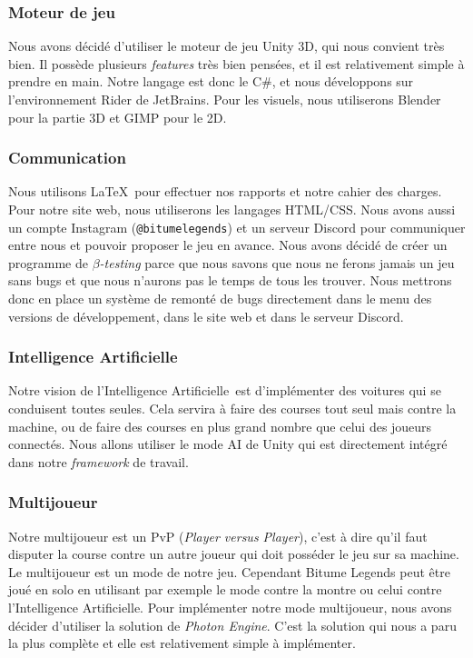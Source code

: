 \documentclass[11pt,a4paper]{article}
\newcommand{\AI}{Intelligence Artificielle}
\begin{document}
    \subsubsection{Moteur de jeu}
      Nous avons décidé d'utiliser le moteur de jeu Unity 3D, qui nous convient très bien. Il possède plusieurs 
      \textit{features} très bien pensées, et il est relativement simple à prendre en main. Notre langage est 
      donc le C\#, et nous développons sur l'environnement Rider de JetBrains. Pour les visuels, nous
      utiliserons Blender pour la partie 3D et GIMP pour le 2D.
    \subsubsection{Communication}
      Nous utilisons \LaTeX\, pour effectuer nos rapports et notre cahier des charges. Pour notre site web, 
      nous utiliserons les langages HTML/CSS. Nous avons aussi un compte Instagram (\texttt{@bitumelegends}) 
      et un serveur Discord pour communiquer entre nous et pouvoir proposer le jeu en avance.
      Nous avons décidé de créer un programme de \(\beta\)\textit{-testing} parce que nous savons que nous 
      ne ferons jamais un jeu sans bugs et que nous n'aurons pas le temps de tous les trouver. Nous mettrons
      donc en place un système de remonté de bugs directement dans le menu des versions de développement, 
      dans le site web et dans le serveur Discord.
    \subsubsection{\AI}
      Notre vision de l'\AI\, est d'implémenter des voitures qui se conduisent toutes seules.
      Cela servira à faire des courses tout seul mais contre la machine, ou de faire des courses en plus grand
      nombre que celui des joueurs connectés. Nous allons utiliser le mode AI de Unity qui est directement intégré
      dans notre \textit{framework} de travail.
    \subsubsection{Multijoueur}
      Notre multijoueur est un PvP (\textit{Player versus Player}), c'est à dire qu'il faut disputer la course 
      contre un autre joueur qui doit posséder le jeu sur sa machine. Le multijoueur est un mode de notre jeu. 
      Cependant Bitume Legends peut être joué en solo en utilisant par exemple le mode contre la montre ou 
      celui contre l'Intelligence Artificielle. Pour implémenter notre mode multijoueur, nous avons décider 
      d'utiliser la solution de \emph{Photon Engine}. C'est la solution qui nous a paru la plus complète et 
      elle est relativement simple à implémenter.
\end{document}
